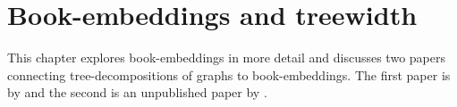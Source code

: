 \chapter{Book-embeddings and treewidth}\label{chap:book-embeddings}

This chapter explores book-embeddings in more detail and discusses two papers connecting tree-decompositions of graphs to book-embeddings. The first paper  is by \textcite{ganleyPagenumberTrees2001} and the second is an unpublished paper by \textcite{hickingbothamStackNumberCliqueSum2023}. 











